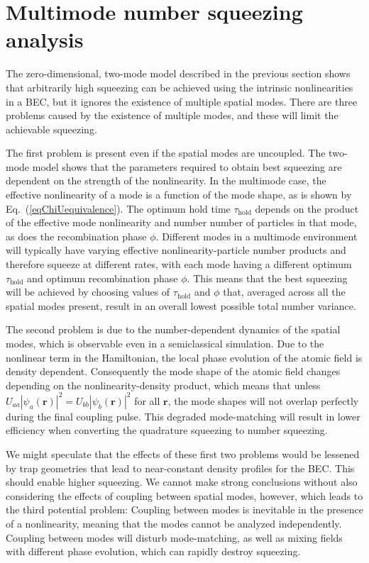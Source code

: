 \documentclass{iopart}
\begin{document}
\section{Multimode number squeezing analysis} \label{sec:MMdescription}

The zero-dimensional, two-mode model described in the previous section shows that arbitrarily high squeezing can be achieved using the intrinsic nonlinearities in a BEC, but it ignores the existence of multiple spatial modes.  There are three problems caused by the existence of multiple modes, and these will limit the achievable squeezing.

The first problem is present even if the spatial modes are uncoupled.  The two-mode model shows that the parameters required to obtain best squeezing are dependent on the strength of the nonlinearity. In the multimode case, the effective nonlinearity of a mode is a function of the mode shape, as is shown by Eq.~(\ref{eqChiUequivalence}). The optimum hold time $\tau_{\mathrm{hold}}$ depends on the product of the effective mode nonlinearity and number number of particles in that mode, as does the recombination phase $\phi$.  Different modes in a multimode environment will typically have varying effective nonlinearity-particle number products and therefore squeeze at different rates, with each mode having a different optimum $\tau_{\mathrm{hold}}$ and optimum recombination phase $\phi$. This means that the best squeezing will be achieved by choosing values of $\tau_{\mathrm{hold}}$ and $\phi$ that, averaged across all the spatial modes present, result in an overall lowest possible total number variance.  

The second problem is due to the number-dependent dynamics of the spatial modes, which is observable even in a semiclassical simulation.  Due to the nonlinear term in the Hamiltonian, the local phase evolution of the atomic field is density dependent.  Consequently the mode shape of the atomic field changes depending on the nonlinearity-density product, which means that unless $U_{aa}|\psi_a({\mathbf{r}})|^2 = U_{bb}|\psi_b({\mathbf{r}})|^2$ for all ${\mathbf{r}}$, the mode shapes will not overlap perfectly during the final coupling pulse. This degraded mode-matching will result in lower efficiency when converting the quadrature squeezing to number squeezing. 

We might speculate that the effects of these first two problems would be lessened by trap geometries that lead to near-constant density profiles for the BEC.  This should enable higher squeezing.  We cannot make strong conclusions without also considering the effects of coupling between spatial modes, however, which leads to the third potential problem: Coupling between modes is inevitable in the presence of a nonlinearity, meaning that the modes cannot be analyzed independently. Coupling between modes will disturb mode-matching, as well as mixing fields with different phase evolution, which can rapidly destroy squeezing.  
\end{document}
